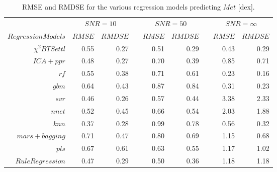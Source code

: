 %
%
\begin{table}\centering
\begin{tabular}{@{}rrrcrrcrr@{}}\toprule
& \multicolumn{2}{c}{$SNR = 10$} & \phantom{ab}& \multicolumn{2}{c}{$SNR = 50$} &
\phantom{ab} & \multicolumn{2}{c}{$SNR = \infty$}\\
\cmidrule{2-3} \cmidrule{5-6} \cmidrule{8-9}
$Regression Models$ & $RMSE$ & $RMDSE$ && $RMSE$ & $RMDSE$     && $RMSE$       & $RMDSE$ \\ \midrule
$\chi^2 BTSettl$    & 0.55    & 0.27   && 0.51 & 0.29 && 0.43  & 0.29 \\
$ ICA+ ppr$         & 0.48 & 0.27 && 0.70  & 0.39 && 0.85  & 0.71 \\
$rf $               & 0.55 & 0.38    && 0.71  & 0.61   && 0.23  & 0.16 \\
$gbm $              & 0.64 & 0.43 && 0.87  & 0.84  && 0.31  & 0.23 \\
$ svr $             & 0.46 & 0.26   && 0.57 & 0.44  && 3.38  & 2.33 \\
$ nnet $            & 0.52 & 0.45      && 0.66 & 0.54  && 2.03  & 1.88 \\
$ knn $             & 0.37  & 0.28   && 0.99  & 0.78 && 0.56 & 0.32 \\ 
$ mars+ bagging $   & 0.71  & 0.47 && 0.80   & 0.69   && 1.15    & 0.68 \\
$ pls $             & 0.67  & 0.61  && 0.63  & 0.55 && 1.17 & 1.02 \\ 
$Rule Regression $  & 0.47 & 0.29 && 0.50 & 0.36  && 1.18 &  1.18 \\

\bottomrule
\end{tabular}
\caption {RMSE and RMDSE for the various regression models predicting $Met$ [dex].} 
\label{tab:models_M_rmse} 
\end{table}


